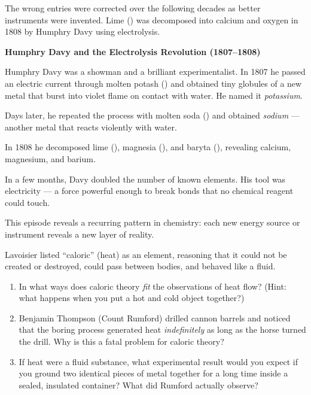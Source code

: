 \documentclass[12pt, a4paper]{book}
\theoremstyle{definition}
\begin{document}
The wrong entries were corrected over the following decades
as better instruments were invented.
Lime () was decomposed into calcium and oxygen in 1808
by Humphry Davy using electrolysis.

\begin{historybox}
\textbf{Humphry Davy and the Electrolysis Revolution (1807--1808)}

Humphry Davy was a showman and a brilliant experimentalist.
In 1807 he passed an electric current through molten potash
() and obtained tiny globules of a new metal
that burst into violet flame on contact with water.
He named it \emph{potassium}.

Days later, he repeated the process with molten soda ()
and obtained \emph{sodium} --- another metal that reacts violently
with water.

In 1808 he decomposed lime (), magnesia (),
and baryta (), revealing calcium, magnesium, and barium.

In a few months, Davy doubled the number of known elements.
His tool was electricity --- a force powerful enough to break
bonds that no chemical reagent could touch.

This episode reveals a recurring pattern in chemistry:
each new energy source or instrument reveals a new layer of reality.
\end{historybox}

\begin{puzzlebox}
Lavoisier listed ``caloric'' (heat) as an element,
reasoning that it could not be created or destroyed,
could pass between bodies, and behaved like a fluid.

\begin{enumerate}[label=(\alph*), leftmargin=*]
  \item In what ways does caloric theory \emph{fit} the
        observations of heat flow?
        (Hint: what happens when you put a hot and cold object together?)

  \item Benjamin Thompson (Count Rumford) drilled cannon barrels
        and noticed that the boring process generated heat
        \emph{indefinitely} as long as the horse turned the drill.
        Why is this a fatal problem for caloric theory?

  \item If heat were a fluid substance, what experimental result
        would you expect if you ground two identical pieces of metal
        together for a long time inside a sealed, insulated container?
        What did Rumford actually observe?
\end{enumerate}
\end{puzzlebox}
\end{document}
